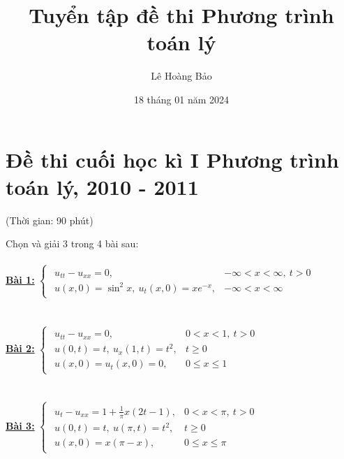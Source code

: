\documentclass[10.5pt, a4paper]{article}
\title{\color{red}\textbf{Tuyển tập đề thi Phương trình toán lý}}
\author{\color{red}Lê Hoàng Bảo}
\date{\color{red}18 tháng 01 năm 2024}
\begin{document}
	\pagestyle{fancy}
	\fancyhead{} %
	\fancyfoot{} %
	\fancyfoot[C]{\textbf\thepage}
	\renewcommand{\headrulewidth}{0.6pt}
	\renewcommand{\footrulewidth}{0.6pt}
	\maketitle
	\newpage
	\tableofcontents
	\newpage
\section{Đề thi cuối học kì I Phương trình toán lý, 2010 - 2011}
\begin{center}
	\color{blue}(Thời gian: 90 phút)
\end{center}
Chọn và giải 3 trong 4 bài sau:\\\\
\color{red}\underline{\textbf{Bài 1:}} \color{black}$\begin{cases}
\begin{array}{ll}
u_{tt}-u_{xx}=0, & -\infty<x<\infty,~t>0\\
u(x,0)=\sin^2x,~u_t(x,0)=xe^{-x}, & -\infty<x<\infty
\end{array}
\end{cases}$\\\\\\
\color{red}\underline{\textbf{Bài 2:}} \color{black}$\begin{cases}
\begin{array}{ll}
u_{tt}-u_{xx}=0, & 0<x<1,~t>0\\
u(0,t)=t,~u_x(1,t)=t^2, & t\ge0\\
u(x,0)=u_t(x,0)=0, & 0\le x\le1
\end{array}
\end{cases}$\\\\\\
\color{red}\underline{\textbf{Bài 3:}} \color{black}$\begin{cases}
\begin{array}{ll}
u_t-u_{xx}=1+\frac1\pi x(2t-1), & 0<x<\pi,~t>0\\
u(0,t)=t,~u(\pi,t)=t^2, & t\ge0\\
u(x,0)=x(\pi-x), & 0\le x\le\pi
\end{array}
\end{cases}$\\\\\\
\end{document}
